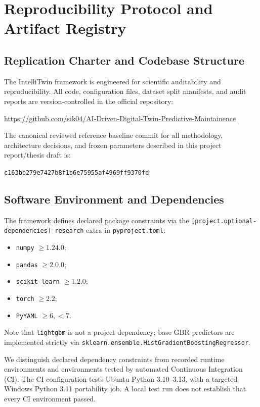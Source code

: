 \chapter{Reproducibility Protocol and Artifact Registry}
\label{chap:reproducibility}

\section{Replication Charter and Codebase Structure}
The IntelliTwin framework is engineered for scientific auditability and reproducibility. All code, configuration files, dataset split manifests, and audit reports are version-controlled in the official repository:
\begin{center}
\url{https://github.com/sik04/AI-Driven-Digital-Twin-Predictive-Maintainence}
\end{center}
The canonical reviewed reference baseline commit for all methodology, architecture decisions, and frozen parameters described in this project report/thesis draft is:
\begin{center}
\texttt{c163bb279e7427b8f1b6e75955af4969ff9370fd}
\end{center}

\section{Software Environment and Dependencies}
The framework defines declared package constraints via the \texttt{[project.optional-dependencies] research} extra in \texttt{pyproject.toml}:
\begin{itemize}
    \item \texttt{numpy} $\ge 1.24.0$;
    \item \texttt{pandas} $\ge 2.0.0$;
    \item \texttt{scikit-learn} $\ge 1.2.0$;
    \item \texttt{torch} $\ge 2.2$;
    \item \texttt{PyYAML} $\ge 6, < 7$.
\end{itemize}
Note that \texttt{lightgbm} is not a project dependency; base GBR predictors are implemented strictly via \texttt{sklearn.ensemble.HistGradientBoostingRegressor}.

We distinguish declared dependency constraints from recorded runtime environments and environments tested by automated Continuous Integration (CI). The CI configuration tests Ubuntu Python 3.10–3.13, with a targeted Windows Python 3.11 portability job. A local test run does not establish that every CI environment passed.

